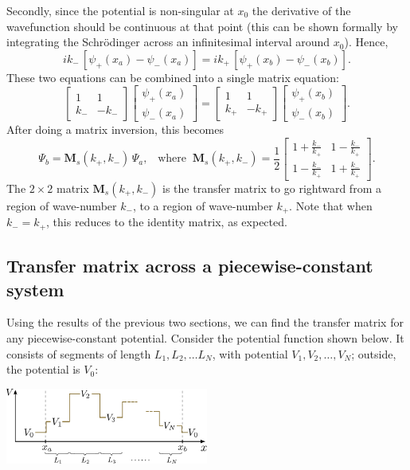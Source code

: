 \documentclass[pra,12pt]{revtex4}
\begin{document}
Secondly, since the potential is non-singular at $x_0$ the derivative
of the wavefunction should be continuous at that point (this can be
shown formally by integrating the Schr\"odinger across an
infinitesimal interval around $x_0$).  Hence,
$$ik_-\, \left[\psi_+(x_a) - \psi_-(x_a)\right] = ik_+\, \left[\psi_+(x_b) - \psi_-(x_b)\right].$$
These two equations can be combined into a single matrix equation:
$$\begin{bmatrix}1 & 1 \\ k_- & - k_-\end{bmatrix}\begin{bmatrix}\psi_+(x_a) \\ \psi_-(x_a) \end{bmatrix} = \begin{bmatrix}1 & 1 \\ k_+ & - k_+\end{bmatrix} \begin{bmatrix}\psi_+(x_b) \\ \psi_-(x_b) \end{bmatrix}.$$
After doing a matrix inversion, this becomes
$$\Psi_b = \mathbf{M}_s(k_+,k_-) \, \Psi_a, \;\;\;\mathrm{where}\;\; \mathbf{M}_s(k_+,k_-) = \frac{1}{2} \begin{bmatrix}1+\frac{k_-}{k_+} & 1-\frac{k_-}{k_+} \\ 1-\frac{k_-}{k_+} & 1+\frac{k_-}{k_+}\end{bmatrix}.$$
The $2\times2$ matrix $\mathbf{M}_s(k_+,k_-)$ is the transfer matrix
to go rightward from a region of wave-number $k_-$, to a region of
wave-number $k_+$.  Note that when $k_- = k_+$, this reduces to the
identity matrix, as expected.

\subsection{Transfer matrix across a piecewise-constant system}

Using the results of the previous two sections, we can find the
transfer matrix for any piecewise-constant potential.  Consider the
potential function shown below.  It consists of segments of length
$L_1, L_2, \dots L_N$, with potential $V_1, V_2, \dots, V_N$; outside,
the potential is $V_0$:

\begin{center}
  \includegraphics[width=0.5\textwidth]{transfer_matrix_setup2}
\end{center}
\end{document}
